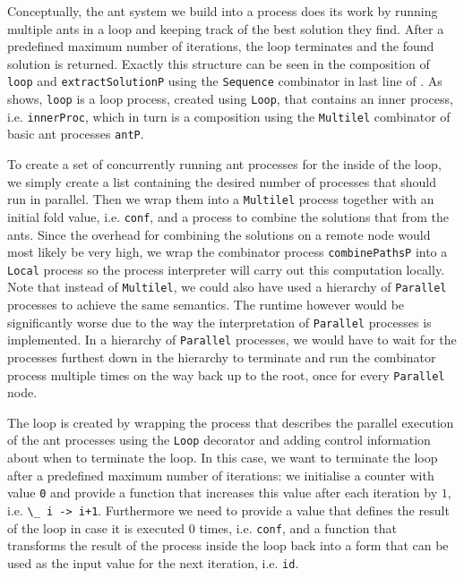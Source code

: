 Conceptually, the ant system we build into a process does its work by running multiple ants in a loop and keeping track of the best solution they find. After a predefined maximum number of iterations, the loop terminates and the found solution is returned. Exactly this structure can be seen in the composition of \texttt{loop} and \texttt{extractSolutionP} using the \texttt{Sequence} combinator in last line of .  As  shows, \texttt{loop} is a loop process, created using \texttt{Loop}, that contains an inner process, i.e. \texttt{innerProc}, which in turn is a composition using the \texttt{Multilel} combinator of basic ant processes \texttt{antP}.

To create a set of concurrently running ant processes for the inside of the loop, we simply create a list containing the desired number of processes that should run in parallel. Then we wrap them into a \texttt{Multilel} process together with an initial fold value, i.e. \texttt{conf}, and a process to combine the solutions that from the ants. Since the overhead for combining the solutions on a remote node would most likely be very high, we wrap the combinator process \texttt{combinePathsP} into a \texttt{Local} process so the process interpreter will carry out this computation locally. Note that instead of \texttt{Multilel}, we could also have used a hierarchy of \texttt{Parallel} processes to achieve the same semantics. The runtime however would be significantly worse due to the way the interpretation of \texttt{Parallel} processes is implemented. In a hierarchy of \texttt{Parallel} processes, we would have to wait for the processes furthest down in the hierarchy to terminate and run the combinator process multiple times on the way back up to the root, once for every \texttt{Parallel} node.

The loop is created by wrapping the process that describes the parallel execution of the ant processes using the \texttt{Loop} decorator and adding control information about when to terminate the loop. In this case, we want to terminate the loop after a predefined maximum number of iterations: we initialise a counter with value \texttt{0} and provide a function that increases this value after each iteration by $1$, i.e. \texttt{\textbackslash\_ i -> i+1}. Furthermore we need to provide a value that defines the result of the loop in case it is executed $0$ times, i.e. \texttt{conf}, and a function that transforms the result of the process inside the loop back into a form that can be used as the input value for the next iteration, i.e. \texttt{id}.